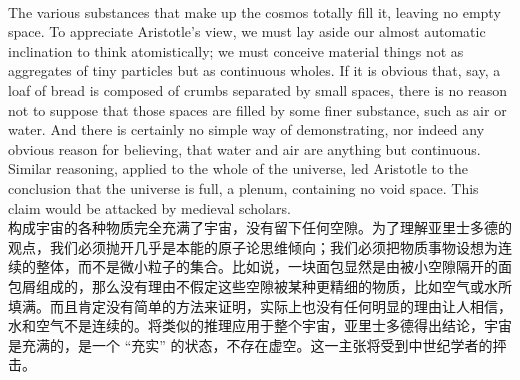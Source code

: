 \documentclass{article}
\begin{document}
\\
The various substances that make up the cosmos totally fill it, leaving no empty space. To appreciate Aristotle’s view, we must lay aside our almost automatic inclination to think atomistically; we must conceive material things not as aggregates of tiny particles but as continuous wholes. If it is obvious that, say, a loaf of bread is composed of crumbs separated by small spaces, there is no reason not to suppose that those spaces are filled by some finer substance, such as air or water. And there is certainly no simple way of demonstrating, nor indeed any obvious reason for believing, that water and air are anything but continuous. Similar reasoning, applied to the whole of the universe, led Aristotle to the conclusion that the universe is full, a plenum, containing no void space. This claim would be attacked by medieval scholars.\\
构成宇宙的各种物质完全充满了宇宙，没有留下任何空隙。为了理解亚里士多德的观点，我们必须抛开几乎是本能的原子论思维倾向；我们必须把物质事物设想为连续的整体，而不是微小粒子的集合。比如说，一块面包显然是由被小空隙隔开的面包屑组成的，那么没有理由不假定这些空隙被某种更精细的物质，比如空气或水所填满。而且肯定没有简单的方法来证明，实际上也没有任何明显的理由让人相信，水和空气不是连续的。将类似的推理应用于整个宇宙，亚里士多德得出结论，宇宙是充满的，是一个 “充实” 的状态，不存在虚空。这一主张将受到中世纪学者的抨击。\\
\end{document}
